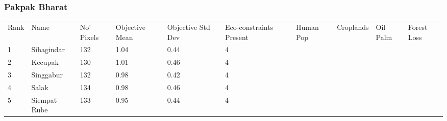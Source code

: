 \subsubsection{Pakpak Bharat}
\begin{table}[ht]
\centering
\begingroup\fontsize{9pt}{10pt}\selectfont
\begin{tabular}{C{0.05\textwidth}C{0.15\textwidth}C{0.08\textwidth}C{0.08\textwidth}C{0.08\textwidth}C{0.08\textwidth}C{0.08\textwidth}C{0.08\textwidth}C{0.08\textwidth}C{0.08\textwidth}}
 Rank & Name & No' Pixels & Objective Mean & Objective Std Dev & Eco-constraints  Present & Human Pop & Croplands & Oil Palm & Forest Loss \\ 
 {1} & Sibagindar & 132 & \textcolor[HTML]{FFFFFF}{1.04} & \textcolor[HTML]{000000}{0.44} & \textcolor[HTML]{000000}{4} &  &  &  &  \\ 
  {2} & Kecupak & 130 & \textcolor[HTML]{FFFFFF}{1.01} & \textcolor[HTML]{000000}{0.46} & \textcolor[HTML]{000000}{4} &  &  &  &  \\ 
  {3} & Singgabur & 132 & \textcolor[HTML]{FFFFFF}{0.98} & \textcolor[HTML]{000000}{0.42} & \textcolor[HTML]{000000}{4} &  &  &  &  \\ 
  {4} & Salak & 134 & \textcolor[HTML]{FFFFFF}{0.98} & \textcolor[HTML]{000000}{0.46} & \textcolor[HTML]{000000}{4} &  &  &  &  \\ 
  {5} & Siempat Rube & 133 & \textcolor[HTML]{000000}{0.95} & \textcolor[HTML]{000000}{0.44} & \textcolor[HTML]{000000}{4} &  &  &  &  \\ 

\end{tabular}
\end{table}
